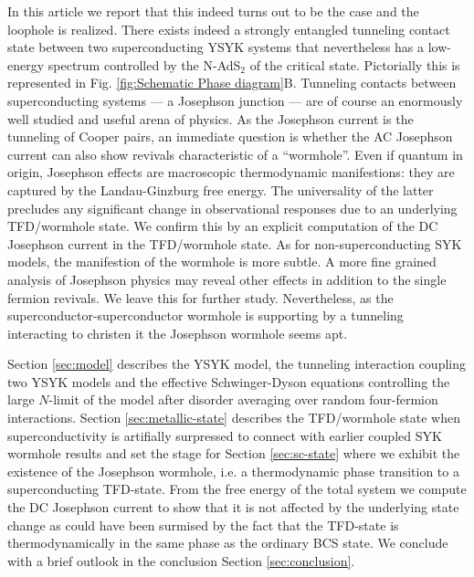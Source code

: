 In this article we report that this indeed turns out to be the case and the loophole is realized. There exists indeed a strongly entangled tunneling contact state between two superconducting YSYK systems that nevertheless has a low-energy spectrum controlled by the N-AdS$_2$ of the critical state.
Pictorially this is represented in Fig. \ref{fig:Schematic Phase diagram}B. Tunneling contacts between superconducting systems --- a Josephson junction --- are of course an enormously well studied and useful arena of physics. As the Josephson current is the tunneling of Cooper pairs, an immediate question is whether the AC Josephson current can also show revivals characteristic of a ``wormhole''. 
Even if quantum in origin, Josephson effects are macroscopic thermodynamic manifestions: they are captured by the Landau-Ginzburg free energy. The universality of the latter precludes any significant change in observational responses due to an underlying TFD/wormhole state. We confirm this by an explicit computation of the DC Josephson current in the TFD/wormhole state. As for non-superconducting SYK models, the manifestion of the wormhole is more subtle. A more fine grained analysis of Josephson physics may reveal other effects in addition to the single fermion revivals. We leave this for further study. Nevertheless, as the superconductor-superconductor wormhole is supporting by a tunneling interacting to christen it the Josephson wormhole seems apt.

Section \ref{sec:model} describes the YSYK model, the tunneling interaction coupling two YSYK models and the effective Schwinger-Dyson equations controlling the large $N$-limit of the model after disorder averaging over random four-fermion interactions. Section \ref{sec:metallic-state} describes the TFD/wormhole state when superconductivity is artifially surpressed to connect with earlier coupled SYK wormhole results and set the stage for Section \ref{sec:sc-state} where we exhibit the existence of the Josephson wormhole, i.e. a thermodynamic phase transition to a superconducting TFD-state. From the free energy of the total system we compute the DC Josephson current to show that it is not affected by the underlying state change as could have been surmised by the fact that the TFD-state is thermodynamically in the same phase as the ordinary BCS state. We conclude with a brief outlook in the conclusion Section \ref{sec:conclusion}.




